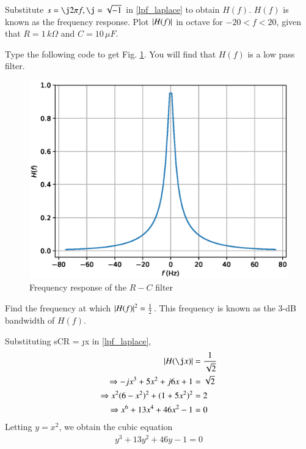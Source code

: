 %
\begin{problem}
Substitute $s = \j 2\pi f, \j =  \sqrt{-1}$ in \eqref{lpf_laplace} to obtain $H(f)$.  $H(f)$ is known as the frequency response. Plot $\left\vert H(f)\right\vert$ in octave for $-20 < f < 20$, given that $R = 1 \,k\Omega$ and $C = 10 \,\mu F$.
\end{problem}
%
\solution 
%
Type  the following code to get Fig. \ref{fig:filter_plot}.  You will find that $H(f)$ is a low pass
filter.
%

%
\begin{figure}[!h]
\centering
\includegraphics[width=\columnwidth]{chapter2/figs/2.2.eps}
\caption{Frequency response of the $R-C$ filter}
\label{fig:filter_plot}
\end{figure}
\begin{problem}
Find the frequency at which $\left\vert H(f)\right\vert^2 = \frac{1}{2}$. This frequency is
known as the 3-dB bandwidth of $H(f)$.
\end{problem}
%
\solution Substituting sCR = \j x in \eqref{lpf_laplace},
%
\begin{align}
 \abs{H(\j x)} &= \frac{1}{\sqrt{2}} \\
 \Rightarrow 
 -jx^3 + 5x^2 +j6x + 1 &= \sqrt{2} \\
\Rightarrow 
 x^2(6-x^2)^2 + (1+5x^2)^2 &= 2 \\
 \Rightarrow 
x^6 + 13x^4 + 46x^2 -1&= 0 
\end{align}
%
Letting $y=x^2$, we obtain the cubic equation
%
\begin{align}
y^3 + 13y^2 + 46 y -1 = 0
\end{align}
